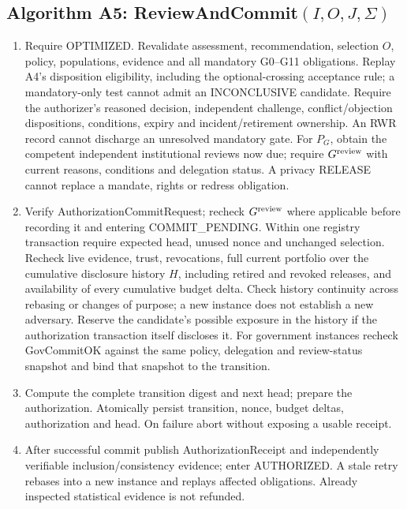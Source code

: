 \subsection{Algorithm A5: ReviewAndCommit$(I,O,J,\Sigma)$}
\begin{enumerate}
\item Require OPTIMIZED. Revalidate assessment, recommendation, selection $O$,
policy, populations, evidence and all mandatory G0--G11 obligations. Replay
A4's disposition eligibility, including the optional-crossing acceptance rule;
a mandatory-only test cannot admit an INCONCLUSIVE candidate.
Require the authorizer's reasoned decision, independent challenge,
conflict/objection dispositions, conditions, expiry and incident/retirement
ownership. An RWR record cannot discharge an unresolved mandatory gate.
For $P_G$, obtain the competent independent institutional reviews now due;
require $G^{\rm review}$ with current reasons, conditions and delegation status.
A privacy RELEASE cannot replace a mandate, rights or redress obligation.
\item Verify AuthorizationCommitRequest; recheck $G^{\rm review}$ where
applicable before recording it and entering COMMIT\_PENDING.
Within one registry transaction require expected head, unused nonce and
unchanged selection. Recheck live evidence, trust, revocations, full current
portfolio over the cumulative disclosure history $H$, including retired and
revoked releases, and availability of every cumulative budget delta. Check
history continuity across rebasing or changes of purpose; a new instance does
not establish a new adversary. Reserve the candidate's possible exposure in
the history if the authorization transaction itself discloses it.
For government instances recheck GovCommitOK against the same policy,
delegation and review-status snapshot and bind that snapshot to the transition.
\item Compute the complete transition digest and next head; prepare the
authorization. Atomically persist transition, nonce, budget deltas,
authorization and head. On failure abort without exposing a usable receipt.
\item After successful commit publish AuthorizationReceipt and independently
verifiable inclusion/consistency evidence; enter AUTHORIZED.
A stale retry rebases into a new instance and replays affected obligations.
Already inspected statistical evidence is not refunded.
\end{enumerate}

